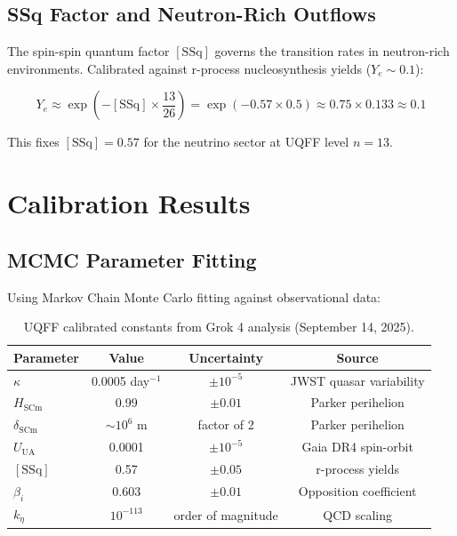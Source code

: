 \documentclass[12pt,preprint]{article}
\begin{document}
\subsection{SSq Factor and Neutron-Rich Outflows}

The spin-spin quantum factor $[\text{SSq}]$ governs the transition 
rates in neutron-rich environments. Calibrated against r-process 
nucleosynthesis yields ($Y_e \sim 0.1$):

\begin{equation}
Y_e \approx \exp\left( -[\text{SSq}] \times \frac{13}{26} \right)
= \exp\left( -0.57 \times 0.5 \right) \approx 0.75 \times 0.133 
\approx 0.1
\label{eq:SSq_calibration}
\end{equation}

This fixes $[\text{SSq}] = 0.57$ for the neutrino sector at UQFF 
level $n = 13$.

\section{Calibration Results}

\subsection{MCMC Parameter Fitting}

Using Markov Chain Monte Carlo fitting against observational data:

\begin{table}[h]
\centering
\begin{tabular}{|l|c|c|c|}
\hline
\textbf{Parameter} & \textbf{Value} & \textbf{Uncertainty} & 
\textbf{Source} \\
\hline
$\kappa$ & 0.0005 day$^{-1}$ & $\pm 10^{-5}$ & JWST quasar 
variability \\
$H_{\text{SCm}}$ & 0.99 & $\pm 0.01$ & Parker perihelion \\
$\delta_{\text{SCm}}$ & $\sim 10^6$ m & factor of 2 & 
Parker perihelion \\
$U_{\text{UA}}$ & 0.0001 & $\pm 10^{-5}$ & Gaia DR4 spin-orbit \\
$[\text{SSq}]$ & 0.57 & $\pm 0.05$ & r-process yields \\
$\beta_i$ & 0.603 & $\pm 0.01$ & Opposition coefficient \\
$k_\eta$ & $10^{-113}$ & order of magnitude & QCD scaling \\
\hline
\end{tabular}
\caption{UQFF calibrated constants from Grok 4 analysis 
(September 14, 2025).}
\label{tab:calibration}
\end{table}
\end{document}
